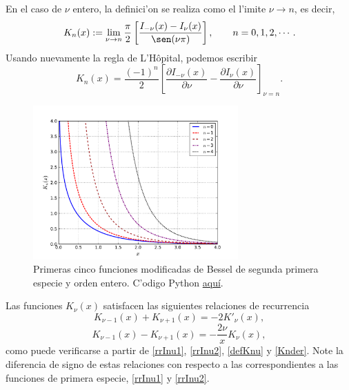 En el caso de $\nu$ entero, la definici'on se realiza como el l'imite $\nu\to n$, es decir,
\begin{equation}
K_n(x) := \lim_{\nu\to n}\frac{\pi}{2}\left[\frac{I_{-\nu}(x)-I_\nu(x)}{\sen(\nu\pi)}\right], \qquad  n=0,1,2, \cdots.
\end{equation}
Usando nuevamente la regla de L'H\^opital, podemos escribir
\begin{equation}\label{Knder}
K_n(x)=\frac{(-1)^n}{2}\left[\frac{\partial I_{-\nu}(x)}{\partial\nu}-\frac{\partial I_\nu(x)}{\partial\nu}\right]_{\nu=n}.
\end{equation}

\begin{figure}[H]
\centering
\includegraphics[angle=0,width=0.7\textwidth]{figs/fig-Bessel-K.pdf}
\caption{Primeras cinco funciones modificadas de Bessel de segunda primera especie y orden entero. C'odigo Python \href{https://github.com/gfrubi/FM2/blob/master/figuras-editables/fig-Bessel.py}{aqu\'i}.}
\label{fig-Kn}
\end{figure}
Las funciones $K_\nu(x)$ satisfacen las siguientes relaciones de recurrencia
\begin{equation}\label{rrKnu1}
K_{\nu-1}(x)+K_{\nu+1}(x)=-2K'_\nu(x),
\end{equation}
\begin{equation}\label{rrKnu2}
K_{\nu-1}(x)-K_{\nu+1}(x)=-\frac{2\nu}{x}K_\nu(x),
\end{equation}
como puede verificarse a partir de \eqref{rrInu1}, \eqref{rrInu2}, \eqref{defKnu} y \eqref{Knder}. Note la diferencia de signo de estas relaciones con respecto a las correspondientes a las funciones de primera especie, \eqref{rrInu1} y \eqref{rrInu2}.

